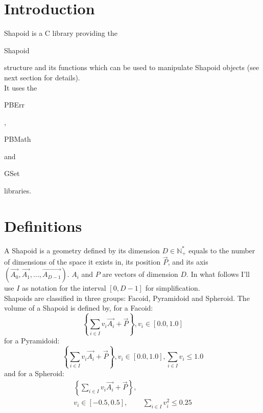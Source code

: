 \section*{Introduction}

Shapoid is a C library providing the \begin{ttfamily}Shapoid\end{ttfamily} structure and its functions which can be used to manipulate Shapoid objects (see next section for details).\\

It uses the \begin{ttfamily}PBErr\end{ttfamily}, \begin{ttfamily}PBMath\end{ttfamily} and \begin{ttfamily}GSet\end{ttfamily} libraries.\\

\section{Definitions}

A Shapoid is a geometry defined by its dimension $D\in\mathbb{N^*_+}$ equals to the number of dimensions of the space it exists in, its position $\overrightarrow{P}$, and its axis $(\overrightarrow{A_0},\overrightarrow{A_1},...,\overrightarrow{A_{D-1}})$. $A_i$ and $P$ are vectors of dimension $D$. In what follows I'll use $I$ as notation for the interval $[0,D-1]$ for simplification.\\

Shapoids are classified in three groups: Facoid, Pyramidoid and Spheroid. The volume of a Shapoid is defined by, for a Facoid: 
\begin{equation}
\left\lbrace \sum_{i\in I}v_i\overrightarrow{A_i}+\overrightarrow{P}\right\rbrace ,v_i\in[0.0,1.0]
\end{equation}
for a Pyramidoid:
\begin{equation}
\left\lbrace \sum_{i\in I}v_i\overrightarrow{A_i}+\overrightarrow{P}\right\rbrace ,v_i\in[0.0,1.0], \sum_{i\in I}v_i\le1.0
\end{equation}
and for a Spheroid:
\begin{equation}
\begin{array}{rl}
\left\lbrace \sum_{i\in I}v_i\overrightarrow{A_i}+\overrightarrow{P}\right\rbrace ,&\\
v_i\in[-0.5,0.5],&\sum_{i\in I}v_i^2\le0.25
\end{array}
\end{equation}

